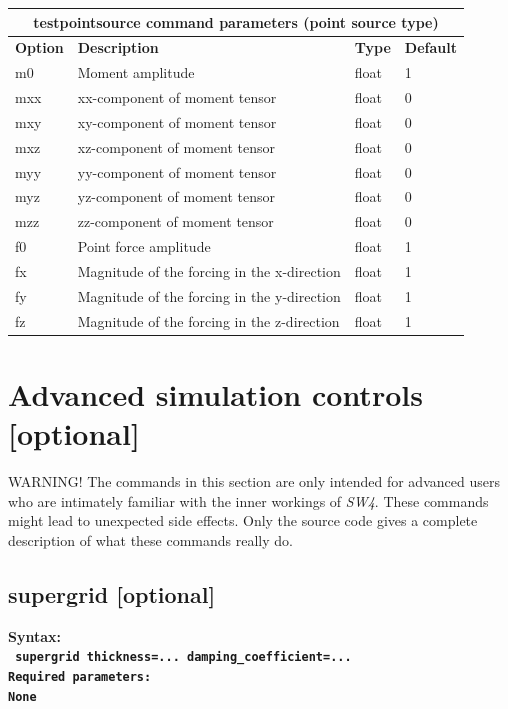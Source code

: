 \documentclass[11pt]{report}
\begin{document}
\begin{center}
\begin{tabular}{|l|p{8cm}|l|l|} \hline
\multicolumn{4}{|c|}{\bf testpointsource command parameters (point source type)}\\ \hline
\bf{Option} & \bf{Description} & \bf{Type} & \bf{Default} \\ \hline \hline
m0   & Moment amplitude & float & 1 \\ \hline
mxx  & xx-component of moment tensor & float & 0 \\ \hline
mxy  & xy-component of moment tensor & float & 0 \\ \hline
mxz  & xz-component of moment tensor & float & 0 \\ \hline
myy  & yy-component of moment tensor & float & 0 \\ \hline
myz  & yz-component of moment tensor & float & 0 \\ \hline
mzz  & zz-component of moment tensor & float & 0 \\ \hline
\hline
f0   & Point force amplitude                       & float & 1\\ \hline 
fx   & Magnitude of the forcing in the x-direction & float & 1 \\ \hline
fy   & Magnitude of the forcing in the y-direction & float & 1 \\ \hline
fz   & Magnitude of the forcing in the z-direction & float & 1 \\ \hline
\end{tabular}
\end{center}

\section{Advanced simulation controls [optional]}

WARNING! The commands in this section are only intended for advanced users who are intimately
familiar with the inner workings of \emph{SW4}. These commands might lead to unexpected side
effects. Only the source code gives a complete description of what these commands really do.
\subsection{supergrid [optional]}
\label{keyword:supergrid}
\begin{flushleft}\bf
Syntax:\\
\tt
supergrid thickness=... damping\_coefficient=...
\\
\bf Required parameters:\\
\rm
None
\end{flushleft}
\end{document}
